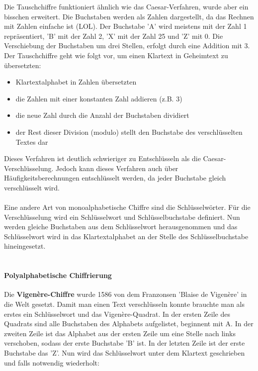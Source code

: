 \documentclass[12pt,a4paper]{report}
\begin{document}
Die Tauschchiffre funktioniert ähnlich wie das Caesar-Verfahren, wurde aber ein bisschen erweitert. Die Buchstaben werden als Zahlen dargestellt, da das Rechnen mit Zahlen einfache ist (LOL). Der Buchstabe 'A' wird meistens mit der Zahl 1 repräsentiert, 'B' mit der Zahl 2, 'X' mit der Zahl 25 und 'Z' mit 0. Die Verschiebung der Buchstaben um drei Stellen, erfolgt durch eine Addition mit 3. Der Tauschchiffre geht wie folgt vor, um einen Klartext in Geheimtext zu übersetzten:

\begin{itemize}
  \item Klartextalphabet in Zahlen übersetzten
  \item die Zahlen mit einer konstanten Zahl addieren (z.B. 3)
  \item die neue Zahl durch die Anzahl der Buchstaben dividiert
  \item der Rest dieser Division (modulo) stellt den Buchstabe des verschlüsselten Textes dar
\end{itemize}

Dieses Verfahren ist deutlich schwieriger zu Entschlüsseln als die Caesar-Verschlüsselung. Jedoch kann dieses Verfahren auch über Häufigkeitsberechnungen entschlüsselt werden, da jeder Buchstabe gleich verschlüsselt wird.\\\\

Eine andere Art von monoalphabetische Chiffre sind die Schlüsselwörter. Für die Verschlüsselung wird ein Schlüsselwort und Schlüsselbuchstabe definiert. Nun werden gleiche Buchstaben aus dem Schlüsselwort herausgenommen und das Schlüsselwort wird in das Klartextalphabet an der Stelle des Schlüsselbuchstabe hineingesetzt. \\\\

\paragraph{Polyalphabetische Chiffrierung}

Die \textbf{Vigenère-Chiffre} wurde 1586 von dem Franzonsen 'Blaise de Vigenère' in die Welt gesetzt. Damit man einen Text verschlüsseln konnte brauchte man als erstes ein Schlüsselwort und das Vigenère-Quadrat. In der ersten Zeile des Quadrats sind alle Buchstaben des Alphabets aufgelistet, beginnent mit A. In der zweiten Zeile ist das Alphabet aus der ersten Zeile um eine Stelle nach links verschoben, sodass der erste Buchstabe 'B' ist. In der letzten Zeile ist der erste Buchstabe das 'Z'. Nun wird das Schlüsselwort unter dem Klartext geschrieben und falls notwendig wiederholt:\\\\
\end{document}
